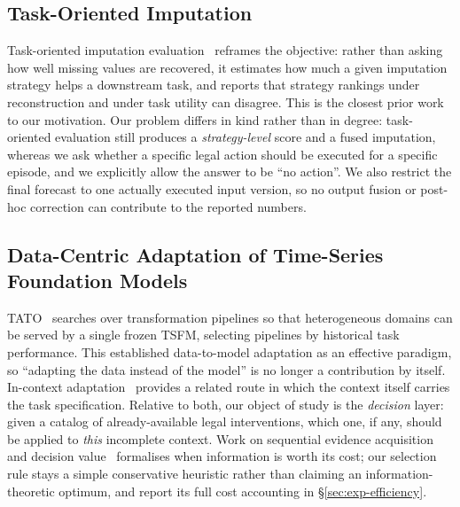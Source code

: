 \documentclass{article}
\newcommand{\tsfm}{TSFM}
\begin{document}
\subsection{Task-Oriented Imputation}
Task-oriented imputation evaluation~\citep{wang2024taskoriented} reframes the objective:
rather than asking how well missing values are recovered, it estimates how much a given
imputation strategy helps a downstream task, and reports that strategy rankings under
reconstruction and under task utility can disagree. This is the closest prior work to our
motivation. Our problem differs in kind rather than in degree: task-oriented evaluation
still produces a \emph{strategy-level} score and a fused imputation, whereas we ask
whether a specific legal action should be executed for a specific episode, and we
explicitly allow the answer to be ``no action''. We also restrict the final forecast to
one actually executed input version, so no output fusion or post-hoc correction can
contribute to the reported numbers.

\subsection{Data-Centric Adaptation of Time-Series Foundation Models}
TATO~\citep{qiu2026tato} searches over transformation pipelines so that heterogeneous
domains can be served by a single frozen \tsfm{}, selecting pipelines by historical task
performance. This established data-to-model adaptation as an effective paradigm, so
``adapting the data instead of the model'' is no longer a contribution by itself.
In-context adaptation~\citep{tsicl2026} provides a related route in which the context
itself carries the task specification. Relative to both, our object of study is the
\emph{decision} layer: given a catalog of already-available legal interventions, which
one, if any, should be applied to \emph{this} incomplete context. Work on sequential
evidence acquisition and decision value~\citep{he2024dime,kang2020forecastwithforecasts}
formalises when information is worth its cost; our selection rule stays a
simple conservative heuristic rather than claiming an information-theoretic optimum, and
report its full cost accounting in \S\ref{sec:exp-efficiency}.
\end{document}
